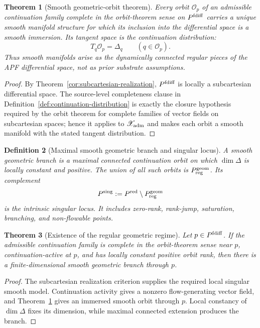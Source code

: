 \documentclass[11pt]{article}
\newtheorem{theorem}{Theorem}[section]
\newtheorem{definition}[theorem]{Definition}
\theoremstyle{remark}
\begin{document}
\begin{theorem}[Smooth geometric-orbit theorem]
\label{thm:smooth-geometric-orbit}
Every orbit $\mathcal O_p$ of an admissible continuation family complete in the orbit-theorem sense on $P^{\rm fdiff}$ carries a unique smooth manifold structure for which its inclusion into the differential space is a smooth immersion.  Its tangent space is the continuation distribution:
\[
        T_q\mathcal O_p=\Delta_q
        \qquad(q\in\mathcal O_p).
\]
Thus smooth manifolds arise as the dynamically connected regular pieces of the
APF differential space, not as prior substrate assumptions.
\end{theorem}

\begin{proof}
By Theorem~\ref{cor:subcartesian-realization}, $P^{\rm fdiff}$ is locally a
subcartesian differential space.  The source-level completeness clause in Definition~\ref{def:continuation-distribution} is exactly the closure hypothesis required by the orbit theorem for complete families of vector fields on subcartesian spaces; hence it applies to $\mathscr X_{\rm adm}$ and
makes each orbit a smooth manifold with the stated tangent distribution.
\end{proof}

\begin{definition}[Maximal smooth geometric branch and singular locus]
\label{def:maximal-smooth-branch}
A \emph{smooth geometric branch} is a maximal connected continuation orbit on
which $\dim\Delta$ is locally constant and positive.  The union of all such
orbits is $P^{\rm geom}_{\rm reg}$.  Its complement
\[
        P^{\rm sing}:=P^{\rm red}\setminus P^{\rm geom}_{\rm reg}
\]
is the intrinsic singular locus.  It includes zero-rank, rank-jump,
saturation, branching, and non-flowable points.
\end{definition}

\begin{theorem}[Existence of the regular geometric regime]
\label{thm:primitive-regular-regime}
Let $p\in P^{\rm fdiff}$.  If the admissible continuation family is complete in the orbit-theorem sense near $p$, continuation-active at $p$, and has locally constant
positive orbit rank, then there is a finite-dimensional smooth geometric
branch through $p$.
\end{theorem}

\begin{proof}
The subcartesian realization criterion supplies the required local singular
smooth model.  Continuation activity gives a nonzero flow-generating vector
field, and Theorem~\ref{thm:smooth-geometric-orbit} gives an immersed smooth
orbit through $p$.  Local constancy of $\dim\Delta$ fixes its dimension, while
maximal connected extension produces the branch.
\end{proof}
\end{document}
